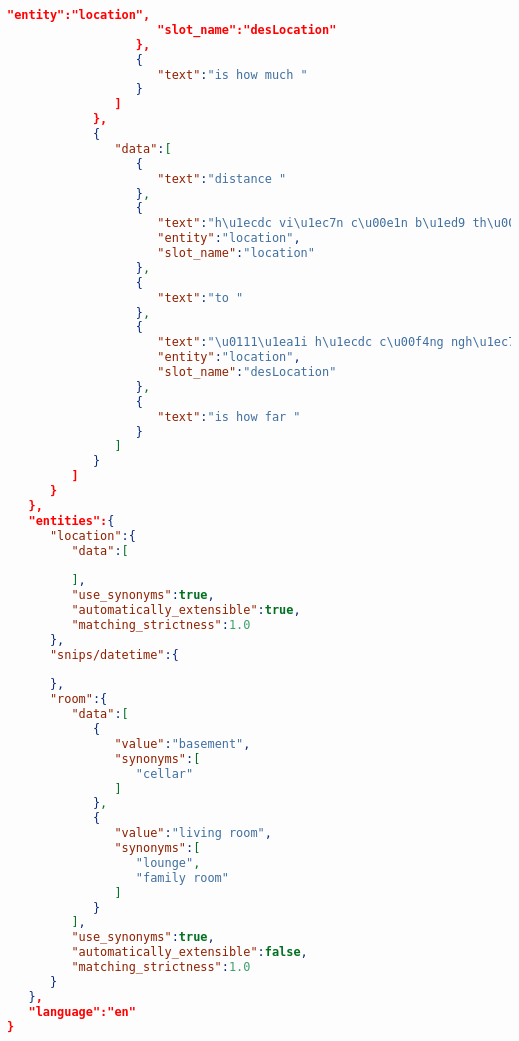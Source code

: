 \begin{lstlisting}[language=json,firstnumber=1]
                     "entity":"location",
                     "slot_name":"desLocation"
                  },
                  {
                     "text":"is how much "
                  }
               ]
            },
            {
               "data":[
                  {
                     "text":"distance "
                  },
                  {
                     "text":"h\u1ecdc vi\u1ec7n c\u00e1n b\u1ed9 th\u00e0nh ph\u1ed1 h\u1ed3 ch\u00ed minh ",
                     "entity":"location",
                     "slot_name":"location"
                  },
                  {
                     "text":"to "
                  },
                  {
                     "text":"\u0111\u1ea1i h\u1ecdc c\u00f4ng ngh\u1ec7 s\u00e0i g\u00f2n ",
                     "entity":"location",
                     "slot_name":"desLocation"
                  },
                  {
                     "text":"is how far "
                  }
               ]
            }
         ]
      }
   },
   "entities":{
      "location":{
         "data":[
            
         ],
         "use_synonyms":true,
         "automatically_extensible":true,
         "matching_strictness":1.0
      },
      "snips/datetime":{
         
      },
      "room":{
         "data":[
            {
               "value":"basement",
               "synonyms":[
                  "cellar"
               ]
            },
            {
               "value":"living room",
               "synonyms":[
                  "lounge",
                  "family room"
               ]
            }
         ],
         "use_synonyms":true,
         "automatically_extensible":false,
         "matching_strictness":1.0
      }
   },
   "language":"en"
}
\end{lstlisting}